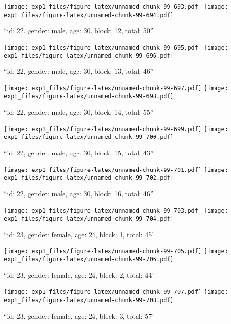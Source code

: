 \documentclass[,]{article}
\begin{document}
\texttt{[image: exp1\_files/figure-latex/unnamed-chunk-99-693.pdf]}
\texttt{[image: exp1\_files/figure-latex/unnamed-chunk-99-694.pdf]}

\newpage
[1] 

``id: 22, gender: male, age: 30, block: 12, total: 50''

\texttt{[image: exp1\_files/figure-latex/unnamed-chunk-99-695.pdf]}
\texttt{[image: exp1\_files/figure-latex/unnamed-chunk-99-696.pdf]}

\newpage
[1] 

``id: 22, gender: male, age: 30, block: 13, total: 46''

\texttt{[image: exp1\_files/figure-latex/unnamed-chunk-99-697.pdf]}
\texttt{[image: exp1\_files/figure-latex/unnamed-chunk-99-698.pdf]}

\newpage
[1] 

``id: 22, gender: male, age: 30, block: 14, total: 55''

\texttt{[image: exp1\_files/figure-latex/unnamed-chunk-99-699.pdf]}
\texttt{[image: exp1\_files/figure-latex/unnamed-chunk-99-700.pdf]}

\newpage
[1] 

``id: 22, gender: male, age: 30, block: 15, total: 43''

\texttt{[image: exp1\_files/figure-latex/unnamed-chunk-99-701.pdf]}
\texttt{[image: exp1\_files/figure-latex/unnamed-chunk-99-702.pdf]}

\newpage
[1] 

``id: 22, gender: male, age: 30, block: 16, total: 46''

\texttt{[image: exp1\_files/figure-latex/unnamed-chunk-99-703.pdf]}
\texttt{[image: exp1\_files/figure-latex/unnamed-chunk-99-704.pdf]}

\newpage
[1] 

``id: 23, gender: female, age: 24, block: 1, total: 45''

\texttt{[image: exp1\_files/figure-latex/unnamed-chunk-99-705.pdf]}
\texttt{[image: exp1\_files/figure-latex/unnamed-chunk-99-706.pdf]}

\newpage
[1] 

``id: 23, gender: female, age: 24, block: 2, total: 44''

\texttt{[image: exp1\_files/figure-latex/unnamed-chunk-99-707.pdf]}
\texttt{[image: exp1\_files/figure-latex/unnamed-chunk-99-708.pdf]}

\newpage
[1] 

``id: 23, gender: female, age: 24, block: 3, total: 57''
\end{document}
